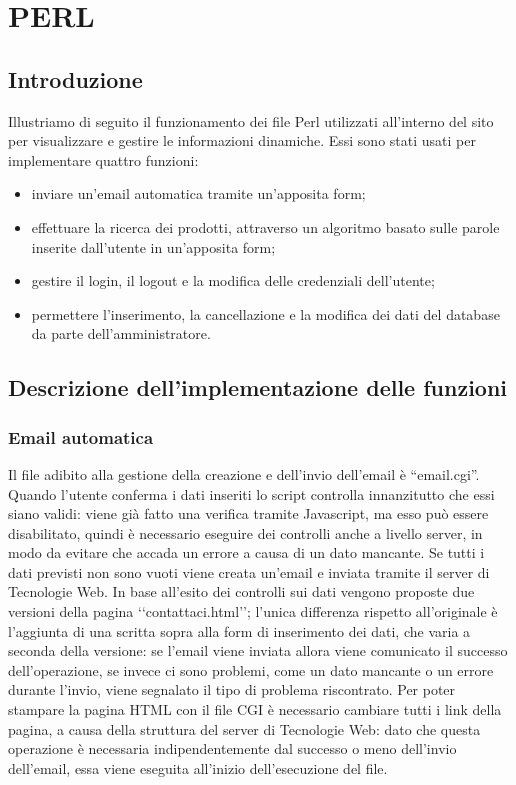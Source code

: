 \section{PERL}{
	\subsection{Introduzione}{
			Illustriamo di seguito il funzionamento dei file Perl utilizzati all'interno del sito per visualizzare e gestire le informazioni dinamiche. Essi sono stati usati per implementare quattro funzioni:
			\begin{itemize}
				\item inviare un'email automatica tramite un'apposita form;
				\item effettuare la ricerca dei prodotti, attraverso un algoritmo basato sulle parole inserite dall'utente in un'apposita form;
				\item gestire il login, il logout e la modifica delle credenziali dell'utente;
				\item permettere l'inserimento, la cancellazione e la modifica dei dati del database da parte dell'amministratore.
			\end{itemize}
	}
	\subsection{Descrizione dell'implementazione delle funzioni}{
		\subsubsection{Email automatica}
			Il file adibito alla gestione della creazione e dell'invio dell'email è ``email.cgi''. Quando l'utente conferma i dati inseriti lo script controlla innanzitutto che essi siano validi: viene già fatto una verifica tramite Javascript, ma esso può essere disabilitato, quindi è necessario eseguire dei controlli anche a livello server, in modo da evitare che accada un errore a causa di un dato mancante. Se tutti i dati previsti non sono vuoti viene creata un'email e inviata tramite il server di Tecnologie Web.
			In base all'esito dei controlli sui dati vengono proposte due versioni della pagina ‘‘contattaci.html’’; l'unica differenza rispetto all'originale è l'aggiunta di una scritta sopra alla form di inserimento dei dati, che varia a seconda della versione: se l'email viene inviata allora viene comunicato il successo dell'operazione, se invece ci sono problemi, come un dato mancante o un errore durante l'invio, viene segnalato il tipo di problema riscontrato. Per poter stampare la pagina HTML con il file CGI è necessario cambiare tutti i link della pagina, a causa della struttura del server di Tecnologie Web: dato che questa operazione è necessaria indipendentemente dal successo o meno dell'invio dell'email, essa viene eseguita all'inizio dell'esecuzione del file.
}}
